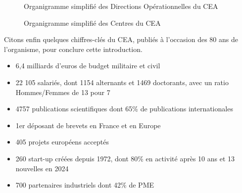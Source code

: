     \begin{figure}[H]
        \centering
        \fbox{}
        \caption{Organigramme simplifié des Directions Opérationnelles du CEA}
        \label{fig:organigramme-CEA}
    \end{figure}

    \begin{figure}[H]
        \centering
        \fbox{}
        \caption{Organigramme simplifié des Centres du CEA}
        \label{fig:organigramme-Centres}
    \end{figure}

Citons enfin quelques chiffres-clés du \gls{CEA}\cite{CEA_prez_generale}, publiés à l'occasion des 80 ans de l'organisme, pour conclure cette introduction.
    \begin{itemize}
        \item 6,4 milliards d'euros de budget militaire et civil
        \item 22 105 salariés, dont 1154 alternants et 1469 doctorants, avec un ratio Hommes/Femmes de 13 pour 7
        \item 4757 publications scientifiques dont 65\% de publications internationales
        \item 1er déposant de brevets en France et en Europe
        \item 405 projets européens acceptés
        \item 260 start-up créées depuis 1972, dont 80\% en activité après 10 ans et 13 nouvelles en 2024
        \item 700 partenaires industriels dont 42\% de PME
    \end{itemize}

